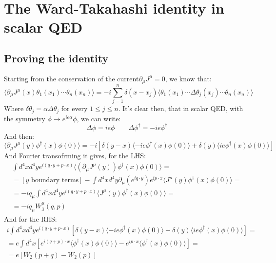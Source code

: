 \documentclass{article}
\begin{document}
\newpage
\section{The Ward-Takahashi identity in scalar QED}
\subsection{Proving the identity}
Starting from the conservation of the current$\partial_\mu J^\mu = 0$, we know that:
\begin{equation}
    \langle
        \partial_\mu J^\mu(x) \theta_1(x_1) \cdots \theta_n(x_n)
    \rangle =
    -i\sum_{j=1}^n \delta(x - x_j) \langle
         \theta_1(x_1) \cdots \Delta\theta_j(x_j) \cdots \theta_n(x_n)
    \rangle
\end{equation}
Where $\delta \theta_j = \alpha \Delta\theta_j$ for every $1 \le j \le n$.
It's clear then, that in scalar QED, with the symmetry $\phi \rightarrow e^{ie\alpha}\phi$, we can write:
\begin{equation}
    \Delta \phi = ie \phi
    \qquad
    \Delta \phi^\dagger = -ie \phi^\dagger
\end{equation}
And then:
\begin{equation}
    \langle
        \partial_\mu J^\mu(y) \phi^\dagger(x) \phi(0)
    \rangle =
    -i\left[
        \delta(y - x) \langle
            -ie\phi^\dagger(x)\phi(0)
        \rangle +
        \delta(y) \langle
            ie\phi^\dagger(x)\phi(0)
        \rangle 
    \right]
\end{equation}
And Fourier transofrming it gives, for the LHS:
\begin{equation}
\begin{gathered}
    \int d^4x d^4y e^{i(q\cdot y + p \cdot x)}\langle
        (\partial_\mu J^\mu(y)) \phi^\dagger(x) \phi(0)
    \rangle = \\ =
    \left[y\text{ boundary terms}\right] - \int d^4x d^4y \partial_\mu\left(e^{iq\cdot y}\right)e^{ip \cdot x}\langle
        J^\mu(y) \phi^\dagger(x) \phi(0)
    \rangle = \\ =
    -iq_\mu \int d^4x d^4y e^{i(q\cdot y + p \cdot x)}\langle
        J^\mu(y) \phi^\dagger(x) \phi(0)
    \rangle = \\ =
    -iq_\mu W_3^\mu(q, p)
\end{gathered}
\end{equation}
And for the RHS:
\begin{equation}
\begin{gathered}
    i\int d^4x d^4y e^{i(q\cdot y + p \cdot x)}\left[
        \delta(y - x) \langle
            -ie\phi^\dagger(x)\phi(0)
        \rangle +
        \delta(y) \langle
            ie \phi^\dagger(x)\phi(0)
        \rangle 
    \right] = \\ =
    e\int d^4x\left[
        e^{i(q + p) \cdot x} \langle
            \phi^\dagger(x)\phi(0)
        \rangle -
        e^{ip \cdot x} \langle
            \phi^\dagger(x)\phi(0)
        \rangle 
    \right] = \\ =
    e\left[W_2(p + q) - W_2(p)\right]
\end{gathered}
\end{equation}
\end{document}
